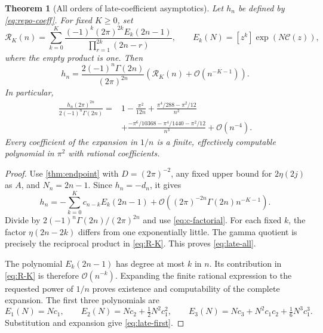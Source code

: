 \documentclass[11pt,a4paper]{article}
\newtheorem{theorem}{Theorem}[section]
\theoremstyle{definition}
\numberwithin{equation}{section}
\newcommand{\coef}[2]{[#1^{#2}]}
\newcommand{\Oh}{\mathcal O}
\newcommand{\cformal}{\mathscr C}
\begin{document}
\begin{theorem}[All orders of late-coefficient asymptotics]
\label{thm:late}
Let $h_n$ be defined by \eqref{eq:repo-coeff}. For fixed $K\ge0$, set
\begin{equation}
 \mathcal R_K(n)=\sum_{k=0}^{K}
  \frac{(-1)^k(2\pi)^{2k}E_k(2n-1)}
       {\prod_{r=1}^{2k}(2n-r)},\qquad
 E_k(N)=\coef{z}{k}\exp(N\cformal(z)),
 \label{eq:R-K}
\end{equation}
where the empty product is one. Then
\begin{equation}
 h_n=\frac{2(-1)^n\Gamma(2n)}{(2\pi)^{2n}}
       \left(\mathcal R_K(n)+\Oh(n^{-K-1})\right).
 \label{eq:late-all}
\end{equation}
In particular,
\begin{align}
 \frac{h_n(2\pi)^{2n}}{2(-1)^n\Gamma(2n)}
 ={}&1-\frac{\pi^2}{12n}
 +\frac{\pi^4/288-\pi^2/12}{n^2}\nonumber\\
 &+\frac{-\pi^6/10368-\pi^4/1440-\pi^2/12}{n^3}
 +\Oh(n^{-4}).
 \label{eq:late-first}
\end{align}
Every coefficient of the expansion in $1/n$ is a finite, effectively computable polynomial in $\pi^2$ with rational coefficients.
\end{theorem}
\begin{proof}
Use \cref{thm:endpoint} with $D=(2\pi)^{-2}$, any fixed upper bound for $2\eta(2j)$ as $A$, and $N_n=2n-1$. Since $h_n=-d_n$, it gives
\[
 h_n=-\sum_{k=0}^{K}c_{n-k}E_k(2n-1)
       +\Oh\!\left((2\pi)^{-2n}\Gamma(2n)n^{-K-1}\right).
\]
Divide by $2(-1)^n\Gamma(2n)/(2\pi)^{2n}$ and use \eqref{eq:c-factorial}. For each fixed $k$, the factor $\eta(2n-2k)$ differs from one exponentially little. The gamma quotient is precisely the reciprocal product in \eqref{eq:R-K}. This proves \eqref{eq:late-all}.

The polynomial $E_k(2n-1)$ has degree at most $k$ in $n$. Its contribution in \eqref{eq:R-K} is therefore $\Oh(n^{-k})$. Expanding the finite rational expression to the requested power of $1/n$ proves existence and computability of the complete expansion. The first three polynomials are
\[
 E_1(N)=Nc_1,\qquad
 E_2(N)=Nc_2+\tfrac12N^2c_1^2,\qquad
 E_3(N)=Nc_3+N^2c_1c_2+\tfrac16N^3c_1^3.
\]
Substitution and expansion give \eqref{eq:late-first}.
\end{proof}
\end{document}
